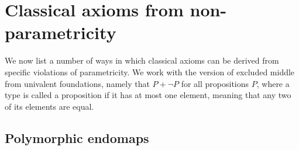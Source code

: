\documentclass[a4paper,UKenglish]{lipics-v2016}
\newcommand{\UU}{\mathcal{U}}
\begin{document}

\section{Classical axioms from non-parametricity}

We now list a number of ways in which classical axioms can be derived
from specific violations of parametricity. We work with the version of
excluded middle from univalent foundations, namely that $P + \neg P$
for all propositions $P$, where a type is called a proposition if it
has at most one element, meaning that any two of its elements are
equal.

\subsection{Polymorphic endomaps}
\end{document}
